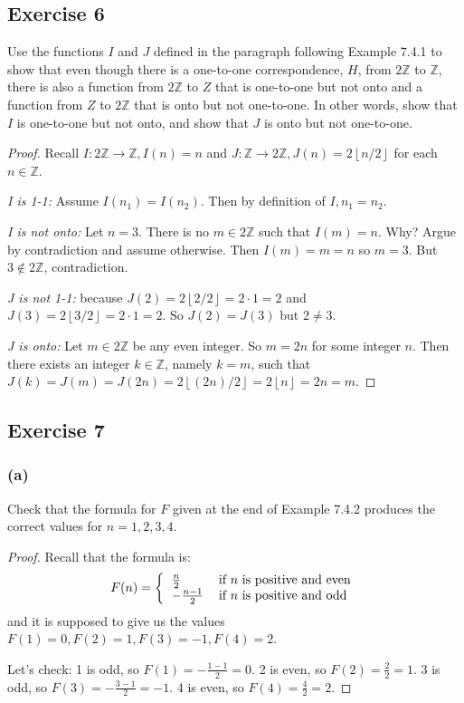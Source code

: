 \documentclass[14pt]{extarticle}
\newcommand{\Z}{\mathbb{Z}}
\newcommand{\floor}[1]{{\left\lfloor#1\right\rfloor}}
\begin{document}
\subsection{Exercise 6}
Use the functions $I$ and $J$ defined in the paragraph following Example 7.4.1 to show that even though there is a
one-to-one correspondence, $H$, from $2\Z$ to $\Z$, there is also a function from $2\Z$ to $Z$ that is one-to-one but
not onto and a function from $Z$ to $2\Z$ that is onto but not one-to-one. In other words, show that $I$ is one-to-one
but not onto, and show that $J$ is onto but not one-to-one.

\begin{proof}
    Recall \(I: 2\Z \to \Z, I(n) = n\) and \(J: \Z \to 2\Z, J(n) = 2\floor{n/2}\) for each \(n \in \Z\).

        {\it I is 1-1:} Assume \(I(n_1) = I(n_2)\). Then by definition of \(I, n_1 = n_2\).

        {\it I is not onto:} Let \(n = 3\). There is no \(m \in 2\Z\) such that \(I(m) = n\). Why? Argue by contradiction
    and assume otherwise. Then \(I(m) = m = n\) so \(m = 3\). But \(3 \notin 2\Z\), contradiction.

        {\it J is not 1-1:} because \(J(2) = 2\floor{2/2} = 2 \cdot 1 = 2\) and \(J(3) = 2\floor{3/2} = 2 \cdot 1 = 2\). So
    \(J(2) = J(3)\) but \(2 \neq 3\).

        {\it J is onto:} Let \(m \in 2\Z\) be any even integer. So \(m = 2n\) for some integer $n$. Then there exists an
    integer $k \in \Z$, namely $k = m$, such that \(J(k) = J(m) = J(2n) = 2\floor{(2n)/2} = 2\floor{n} = 2n = m\).
\end{proof}

\subsection{Exercise 7}
\subsubsection{(a)}
Check that the formula for $F$ given at the end of Example 7.4.2 produces the correct values for \(n = 1, 2, 3, 4\).

\begin{proof}
    Recall that the formula is:
    \[
        F(n) =
        \left\{
        \begin{tabular}{ll}
            \(\frac{n}{2}\)    & if $n$ is positive and even \\
            \(-\frac{n-1}{2}\) & if $n$ is positive and odd
        \end{tabular}
        \right.
    \]
    and it is supposed to give us the values \(F(1) = 0, F(2) = 1, F(3) = -1, F(4) = 2\).

    Let's check: 1 is odd, so \(F(1) = -\frac{1-1}{2} = 0\). 2 is even, so \(F(2) = \frac{2}{2} = 1\). 3 is odd, so
    \(F(3) = -\frac{3-1}{2} = -1\). 4 is even, so \(F(4) = \frac{4}{2} = 2\).
\end{proof}
\end{document}
